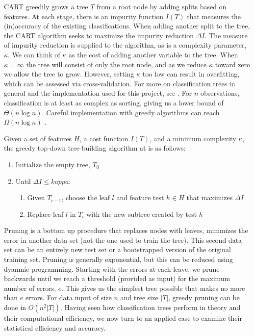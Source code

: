 \documentclass[12pt,letterpaper]{article}
\begin{document}
CART greedily grows a tree $T$ from a root node by adding splits based on features. At each stage, there is an impurity function $I(T)$ that measures the (in)accuracy of the existing classifications. When adding another split to the tree, the CART algorithm seeks to maximize the impurity reduction $\Delta I$. The measure of impurity reduction is supplied to the algorithm, as is a complexity parameter, $\kappa$. We can think of $\kappa$ as the cost of adding another variable to the tree. When $\kappa=\infty$ the tree will consist of only the root node, and as we reduce $\kappa$ toward zero we allow the tree to grow. However, setting $\kappa$ too low can result in overfitting, which can be assessed via cross-validation. For more on classification trees in general and the implementation used for this project, see \citep{murphy2012machine,olshen1984classification,therneau1997introduction}. For $n$ observations, classification is at least as complex as sorting, giving us a lower bound of $\Theta(n \log n)$. Careful implementation with greedy algorithms can reach $\Omega(n \log n)$ \citep{latkowski2003high}. 

Given a set of features $H$, a cost function $I(T)$, and a minimum complexity $\kappa$, the greedy top-down tree-building algorithm at is as follows:

\begin{enumerate}
  \item Initialize the empty tree, $T_0$
  \item Until $\Delta I \leq kappa$:
  \begin{enumerate}
  	\item Given $T_{i-1}$, choose the leaf $l$ and feature test $h \in H$ that maximizes $\Delta I$
  	\item Replace leaf $l$ in $T_i$ with the new subtree created by test $h$
  \end{enumerate}
\end{enumerate}

Pruning is a bottom up procedure that replaces nodes with leaves, minimizes the error in another data set (not the one used to train the tree). This second data set can be an entirely new test set or a bootstrapped version of the original training set. Pruning is generally exponential, but this can be reduced using dyanmic programming. Starting with the errors at each leave, we prune backwards until we reach a threshold (provided as input) for the maximum number of errors, $e$. This gives us the simplest tree possible that makes no more than $e$ errors. For data input of size $n$ and tree size $|T|$, greedy pruning can be done in $O(n^2 |T|)$. Having seen how classification trees perform in theory and their computational efficiency, we now turn to an applied case to examine their statistical efficiency and accuracy.
\end{document}
